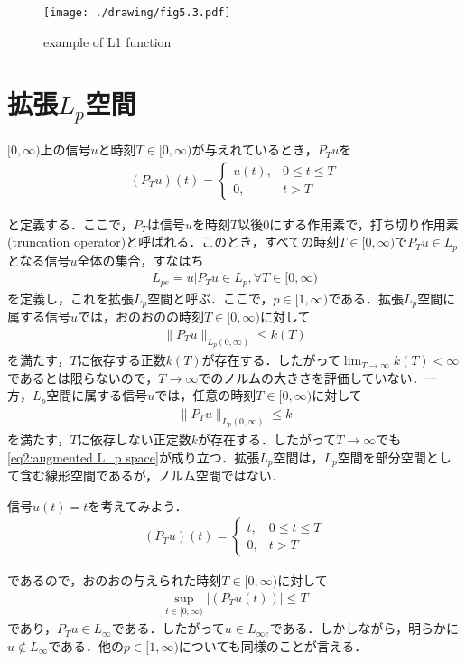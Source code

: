 \documentclass[a4paper,11pt,uplatex]{jsarticle} %
\theoremstyle{definition}	%
\begin{document}
\begin{figure}[t]
\centering
\texttt{[image: ./drawing/fig5.3.pdf]}
\caption{example of L1 function}
\label{fig5.3}
\end{figure}
\section{拡張$L_p$空間}
$[0, \infty)$上の信号$u$と時刻$T \in [0, \infty) $が与えれているとき，$P_T u $を
\begin{align}
\label{truncation operator}
(P_T u)(t) =
\begin{cases}
u(t), & 0 \leq t \leq T \\
0,    & t>T
\end{cases}
\end{align}

と定義する．ここで，$P_T$は信号$u$を時刻$T$以後$0$にする作用素で，打ち切り作用素(truncation operator)と呼ばれる．このとき，すべての時刻$T \in [0,\infty)$で$P_T u \in L_p $となる信号$u$全体の集合，すなはち
\begin{align}
\label{augmented L_p space}
L_{pe} = {u| P_T u \in L_p, \forall T \in [0, \infty )}
\end{align}
を定義し，これを拡張$L_p$空間と呼ぶ．ここで，$p \in [1, \infty ) $である．拡張$L_p$空間に属する信号$u$では，おのおのの時刻$T \in [0, \infty )$に対して
\begin{align}
\label{eq1:augmented L_p space}
\| P_T u \|_{L_p (0, \infty)} \leq k(T)
\end{align}
を満たす，$T$に依存する正数$k(T)$が存在する．したがって$\lim_{T \to \infty } k(T) < \infty $であるとは限らないので，$T \to \infty $でのノルムの大きさを評価していない．一方，$L_p$空間に属する信号$u$では，任意の時刻$T \in [0, \infty)$に対して
\begin{align}
\label{eq2:augmented L_p space}
\| P_T u \|_{L_p (0, \infty )} \leq k
\end{align}
を満たす，$T$に依存しない正定数$k$が存在する．したがって$T \to \infty $でも\eqref{eq2:augmented L_p space}が成り立つ．拡張$L_p$空間は，$L_p$空間を部分空間として含む線形空間であるが，ノルム空間ではない．

\begin{tcolorbox}[title=例5.3,
drop small lifted shadow=black]
信号$u(t)=t$を考えてみよう．
\begin{align}
\label{eq1:example5.3}
(P_T u )(t) =
\begin{cases}
    t, &  0 \leq t \leq T \\
    0, &  t   >   T
\end{cases}
\end{align}

であるので，おのおの与えられた時刻$T \in [0, \infty ) $に対して
\begin{align}
\label{eq2:example5.3}
\sup_{t \in [0, \infty )} | (P_T u (t)) | \leq T
\end{align}
であり，$P_T u \in L_\infty$である．したがって$u \in L_{\infty e}$である．しかしながら，明らかに$u \notin L_\infty $である．他の$p \in [1, \infty)$についても同様のことが言える．
\end{tcolorbox}
\end{document}
